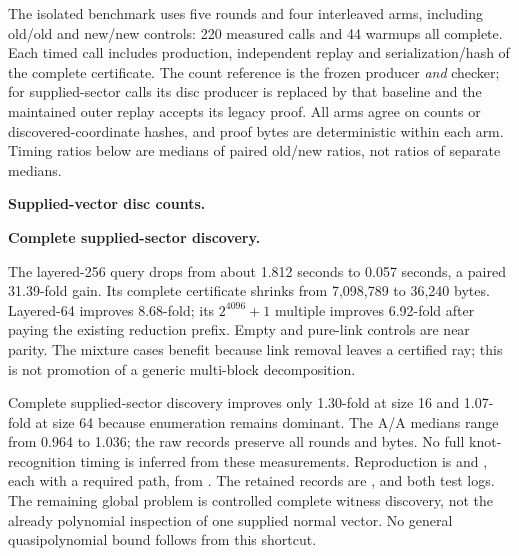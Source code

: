 The isolated benchmark uses five rounds and four interleaved arms,
including old/old and new/new controls: 220 measured calls and 44 warmups
all complete. Each timed call includes production, independent replay and
serialization/hash of the complete certificate. The count reference is
the frozen producer \emph{and} checker; for supplied-sector calls its disc
producer is replaced by that baseline and the maintained outer replay
accepts its legacy proof. All arms agree on counts or discovered-coordinate
hashes, and proof bytes are deterministic within each arm. Timing ratios
below are medians of paired old/new ratios, not ratios of separate medians.

\noindent\textbf{Supplied-vector disc counts.}

\noindent\textbf{Complete supplied-sector discovery.}


The layered-256 query drops from about 1.812 seconds to 0.057 seconds,
a paired 31.39-fold gain. Its complete certificate shrinks from 7,098,789
to 36,240 bytes. Layered-64 improves 8.68-fold; its $2^{4096}+1$ multiple
improves 6.92-fold after paying the existing reduction prefix. Empty and
pure-link controls are near parity. The mixture cases benefit because
link removal leaves a certified ray; this is not promotion of a generic
multi-block decomposition.

Complete supplied-sector discovery improves only 1.30-fold at size 16 and
1.07-fold at size 64 because enumeration remains dominant. The A/A medians
range from 0.964 to 1.036; the raw records preserve all rounds and bytes.
No full knot-recognition timing is inferred from these measurements.
Reproduction is 
and , each with a required 
path, from . The retained records
are , 
and both test logs. The remaining global problem is controlled complete
witness discovery, not the already polynomial inspection of one supplied
normal vector. No general quasipolynomial bound follows from this shortcut.
